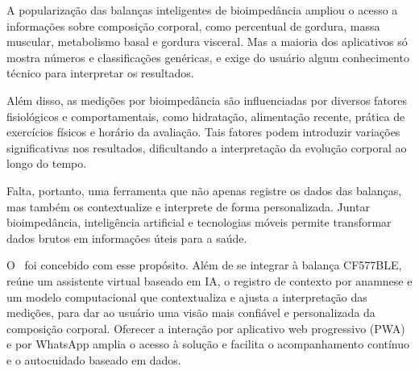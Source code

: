 A popularização das balanças inteligentes de bioimpedância ampliou o acesso a
informações sobre composição corporal, como percentual de gordura, massa muscular,
metabolismo basal e gordura visceral. Mas a maioria dos aplicativos só mostra números e
classificações genéricas, e exige do usuário algum conhecimento técnico para interpretar
os resultados.

Além disso, as medições por bioimpedância são influenciadas por diversos fatores
fisiológicos e comportamentais, como hidratação, alimentação recente, prática de
exercícios físicos e horário da avaliação. Tais fatores podem introduzir variações
significativas nos resultados, dificultando a interpretação da evolução corporal ao longo
do tempo.

Falta, portanto, uma ferramenta que não apenas registre os dados das balanças, mas também
os contextualize e interprete de forma personalizada. Juntar bioimpedância, inteligência
artificial e tecnologias móveis permite transformar dados brutos em informações úteis para
a saúde.

O \sintonia\ foi concebido com esse propósito. Além de se integrar à balança CF577BLE,
reúne um assistente virtual baseado em IA, o registro de contexto por anamnese e um modelo
computacional que contextualiza e ajusta a interpretação das medições, para dar ao usuário
uma visão mais confiável e personalizada da composição corporal. Oferecer a interação por
aplicativo web progressivo (PWA) e por WhatsApp amplia o acesso à solução e facilita o
acompanhamento contínuo e o autocuidado baseado em dados.
